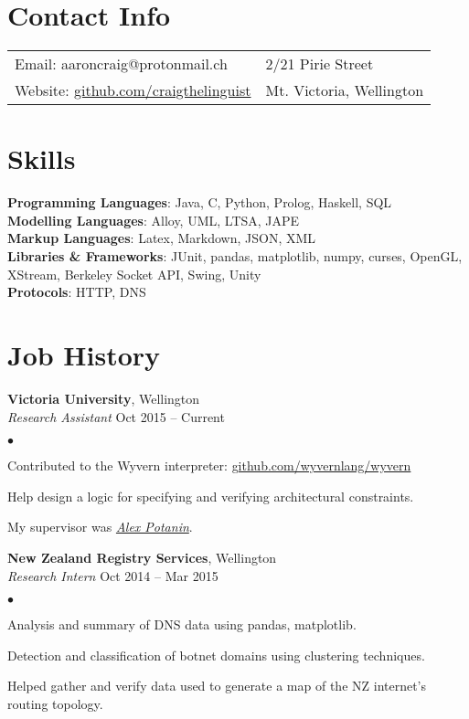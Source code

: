\documentclass[margin,line]{res}
\newenvironment{list2}{
  \begin{list}{$\bullet$}{%
      \setlength{\itemsep}{0in}
      \setlength{\parsep}{0in} \setlength{\parskip}{0in}
      \setlength{\topsep}{0in} \setlength{\partopsep}{0in}
      \setlength{\leftmargin}{0.2in}}}
  {\end{list}}
\begin{document}
\begin{resume}

  \section{\sc Contact Info}
    \vspace{.05in}
    \begin{tabular}{@{}p{3.5in}p{3in}}
      {Email}: aaroncraig@protonmail.ch & 2/21 Pirie Street \\
      {Website}:  \url{github.com/craigthelinguist}& Mt. Victoria, Wellington \\
    \end{tabular}

   \section{\sc Skills}
    {\bf Programming Languages}: Java, C, Python, Prolog, Haskell, SQL\\
    {\bf Modelling Languages}: Alloy, UML, LTSA, JAPE\\
    {\bf Markup Languages}: Latex, Markdown, JSON, XML\\
    {\bf Libraries \& Frameworks}: JUnit, pandas, matplotlib, numpy, curses, OpenGL, XStream, Berkeley Socket API, Swing, Unity\\
    {\bf Protocols}: HTTP, DNS

  \section{\sc Job History}
  
  	{\bf Victoria University}, Wellington\\
  	{\em Research Assistant} \hfill {Oct 2015 -- Current}
  	\begin{list2}
  		\item Contributed to the Wyvern interpreter: \url{github.com/wyvernlang/wyvern}
		\item Help design a logic for specifying and verifying architectural constraints.
  		\item My supervisor was \href{http://homepages.mcs.vuw.ac.nz/~alex/}{\textit{Alex Potanin}}.
	\end{list2}
  
    {\bf New Zealand Registry Services}, Wellington\\
    {\em Research Intern} \hfill {Oct 2014 -- Mar 2015}
    \begin{list2}
	\item Analysis and summary of DNS data using pandas, matplotlib.
	\item Detection and classification of botnet domains using clustering techniques.
	\item Helped gather and verify data used to generate a map of the NZ internet's routing topology.
    \end{list2}


\end{resume}
\end{document}
